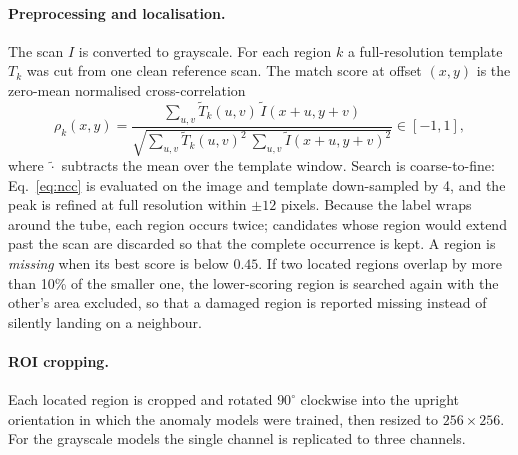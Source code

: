 \paragraph{Preprocessing and localisation.} The scan $I$ is converted to grayscale. For each region $k$ a full-resolution template $T_k$ was cut from one clean reference scan. The match score at offset $(x,y)$ is the zero-mean normalised cross-correlation~\cite{lewis1995}
\begin{equation}
    \rho_k(x,y) = \frac{\sum_{u,v}\tilde T_k(u,v)\,\tilde I(x+u,y+v)}
    {\sqrt{\sum_{u,v}\tilde T_k(u,v)^2\ \sum_{u,v}\tilde I(x+u,y+v)^2}}\in[-1,1],
    \label{eq:ncc}
\end{equation}
where $\tilde{\cdot}$ subtracts the mean over the template window. Search is coarse-to-fine: Eq.~\eqref{eq:ncc} is evaluated on the image and template down-sampled by 4, and the peak is refined at full resolution within $\pm12$ pixels. Because the label wraps around the tube, each region occurs twice; candidates whose region would extend past the scan are discarded so that the complete occurrence is kept. A region is \emph{missing} when its best score is below $0.45$. If two located regions overlap by more than 10\% of the smaller one, the lower-scoring region is searched again with the other's area excluded, so that a damaged region is reported missing instead of silently landing on a neighbour.

\paragraph{ROI cropping.} Each located region is cropped and rotated $90^\circ$ clockwise into the upright orientation in which the anomaly models were trained, then resized to $256{\times}256$. For the grayscale models the single channel is replicated to three channels.

